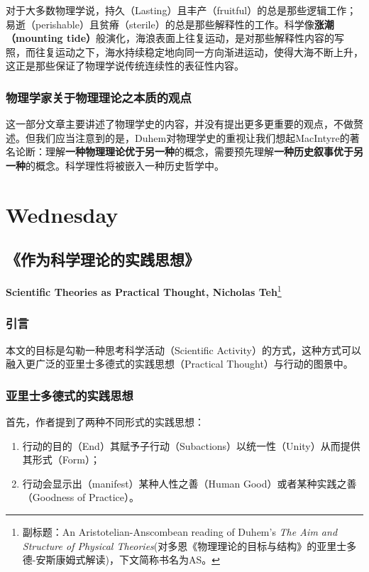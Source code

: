 \documentclass[12pt, a4paper, oneside]{ctexart}
\renewcommand{\b}{\textbf}
\newcommand{\f}{\footnote}
\begin{document}
对于大多数物理学说，持久（Lasting）且丰产（fruitful）的总是那些逻辑工作；易逝（perishable）且贫瘠（sterile）的总是那些解释性的工作。科学像\b{涨潮（mounting tide）}般演化，海浪表面上往复运动，是对那些解释性内容的写照，而往复运动之下，海水持续稳定地向同一方向渐进运动，使得大海不断上升，这正是那些保证了物理学说传统连续性的表征性内容。

\subsubsection{物理学家关于物理理论之本质的观点}
这一部分文章主要讲述了物理学史的内容，并没有提出更多更重要的观点，不做赘述。但我们应当注意到的是，Duhem对物理学史的重视让我们想起MacIntyre的著名论断：理解\b{一种物理理论优于另一种}的概念，需要预先理解\b{一种历史叙事优于另一种}的概念。科学理性将被嵌入一种历史哲学中。

\section{Wednesday}
\subsection{《作为科学理论的实践思想》}
\textbf{Scientific Theories as Practical Thought, Nicholas Teh}\f{副标题：An Aristotelian-Anscombean reading of Duhem's \textit{The Aim and Structure of Physical Theories}(对多恩《物理理论的目标与结构》的亚里士多德-安斯康姆式解读)，下文简称书名为AS。}

\subsubsection{引言}
本文的目标是勾勒一种思考科学活动（Scientific Activity）的方式，这种方式可以融入更广泛的亚里士多德式的实践思想（Practical Thought）与行动的图景中。

\subsubsection{亚里士多德式的实践思想}
首先，作者提到了两种不同形式的实践思想：
\begin{enumerate}
    \item 行动的目的（End）其赋予子行动（Subactions）以统一性（Unity）从而提供其形式（Form）；
    \item 行动会显示出（manifest）某种人性之善（Human Good）或者某种实践之善（Goodness of Practice）。
\end{enumerate}
\end{document}
